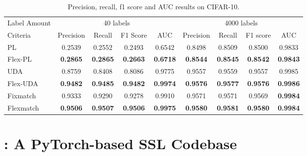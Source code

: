 \begin{table}[h]
\centering
\caption{Precision, recall, f1 score and AUC results on CIFAR-10. }
\begin{adjustbox}{width=\columnwidth,center}
\label{tb-prf1}
\begin{tabular}{l|cccc|cccc}
\toprule
Label Amount & \multicolumn{4}{c|}{40 labels}& \multicolumn{4}{c}{4000 labels}\\ \cmidrule(r){1-1} \cmidrule(lr){2-5} \cmidrule(l){6-9} 
Criteria    & \multicolumn{1}{c}{Precision}  &  \multicolumn{1}{c}{Recall}  &	\multicolumn{1}{c}{F1 Score}  &	\multicolumn{1}{c|}{AUC}  &\multicolumn{1}{c}{Precision}  &	\multicolumn{1}{c}{Recall}  &	\multicolumn{1}{c}{F1 score}  &	\multicolumn{1}{c}{AUC} \\
\cmidrule(r){1-1} \cmidrule(lr){2-5} \cmidrule(l){6-9} 

PL    & 0.2539  &  0.2552  &	0.2493  &	0.6542  &0.8498  &	0.8509  &	0.8500  &	0.9833\\

Flex-PL    & \textbf{0.2865}& \textbf{0.2865}	&\textbf{0.2663}	&\textbf{0.6718} &\textbf{0.8544}	&\textbf{0.8545}	&\textbf{0.8542}	&\textbf{0.9843}

 \\\cmidrule(r){1-1} \cmidrule(lr){2-5} \cmidrule(l){6-9} 

UDA    & 0.8759	&0.8408	&0.8086	&0.9775 &0.9557	&0.9559	&0.9557	&0.9985 

 \\

Flex-UDA    & \textbf{0.9482}	&\textbf{0.9485}	&\textbf{0.9482} 	&\textbf{0.9974} &\textbf{0.9576}	&\textbf{0.9577}	&\textbf{0.9576}	&\textbf{0.9986}

\\\cmidrule(r){1-1} \cmidrule(lr){2-5} \cmidrule(l){6-9} 

Fixmatch    & 0.9333	&0.9290	&0.9278	&0.9910 &0.9571	&0.9571	&0.9569	&\textbf{0.9984} 

\\
 
Flexmatch    & \textbf{0.9506}	&\textbf{0.9507}	&\textbf{0.9506}	&\textbf{0.9975} & \textbf{0.9580}	&\textbf{0.9581}	&\textbf{0.9580}	&\textbf{0.9984}

\\
\bottomrule
\end{tabular}
\end{adjustbox}
\end{table}


\section{\codebase: A PyTorch-based SSL Codebase}
\label{appendix:torchssl}



